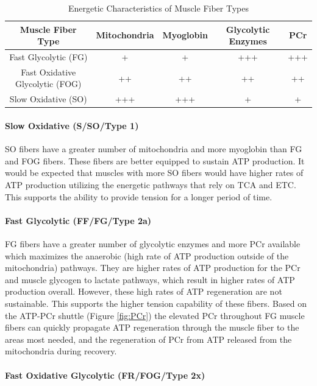 \begin{table}[h!]
\centering
\begin{tabular}{||c c c c c||} 
 \hline
 Muscle Fiber Type & Mitochondria & Myoglobin & Glycolytic Enzymes & PCr \\ [0.5ex] 
 \hline\hline
 Fast Glycolytic (FG)  & + & + & +++ & +++ \\ 
 Fast Oxidative Glycolytic (FOG) & ++ & ++ & ++ & ++ \\
 Slow Oxidative (SO) &  +++ & +++ & + & + \\ [1ex] 
 \hline
\end{tabular}
\caption{Energetic Characteristics of Muscle Fiber Types}
\label{table:Muscle_Fiber_Energetics}
\end{table}

\paragraph{Slow Oxidative (S/SO/Type 1)}

SO fibers have a greater number of mitochondria and more myoglobin than FG and FOG fibers. These fibers are better equipped to sustain ATP production. It would be expected that muscles with more SO fibers would have higher rates of ATP production utilizing the energetic pathways that rely on TCA and ETC. This supports the ability to provide tension for a longer period of time.

\paragraph{Fast Glycolytic (FF/FG/Type 2a)}

FG fibers have a greater number of glycolytic enzymes and more PCr available which maximizes the anaerobic (high rate of ATP production outside of the mitochondria) pathways. They are higher rates of ATP production for the PCr and muscle glycogen to lactate pathways, which result in higher rates of ATP production overall. However, these high rates of ATP regeneration are not sustainable. This supports the higher tension capability of these fibers. Based on the ATP-PCr shuttle (Figure \ref{fig:PCr}) the elevated PCr throughout FG muscle fibers can quickly propagate ATP regeneration through the muscle fiber to the areas most needed, and the regeneration of PCr from ATP released from the mitochondria during recovery.

\paragraph{Fast Oxidative Glycolytic (FR/FOG/Type 2x)}

